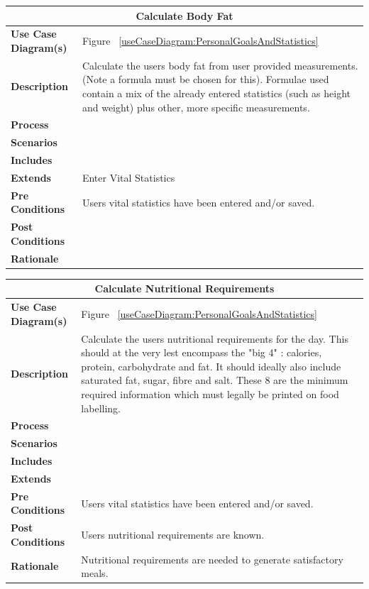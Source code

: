 \documentclass[12pt]{article}
\begin{document}
\begin{center}
\begin{tabularx}{\textwidth}{ |X|X|}
\hline
\multicolumn{2}{|c|}{\textbf{Calculate Body Fat}}\\
\hline
\hline
\textbf{Use Case Diagram(s)} & Figure ~\ref{useCaseDiagram:PersonalGoalsAndStatistics}\\ \hline
\textbf{Description} & Calculate the users body fat from user provided measurements. (Note a formula must be chosen for this). Formulae used contain a mix of the already entered statistics (such as height and weight) plus other, more specific measurements.\\ \hline
\textbf{Process} & \\ \hline
\textbf{Scenarios} & \\ \hline
\textbf{Includes} & \\ \hline
\textbf{Extends} & Enter Vital Statistics \\ \hline
\textbf{Pre Conditions} & Users vital statistics have been entered and/or saved.\\ \hline
\textbf{Post Conditions} & \\ \hline
\textbf{Rationale} & \\ \hline
\end{tabularx}
\end{center}


\begin{center}
\begin{tabularx}{\textwidth}{ |X|X|}
\hline
\multicolumn{2}{|c|}{\textbf{Calculate Nutritional Requirements}}\\
\hline
\hline
\textbf{Use Case Diagram(s)} & Figure ~\ref{useCaseDiagram:PersonalGoalsAndStatistics}\\ \hline
\textbf{Description} & Calculate the users nutritional requirements for the day. This should at the very lest encompass the "big 4" : calories, protein, carbohydrate and fat. It should ideally also include saturated fat, sugar, fibre and salt. These 8 are the minimum required information which must legally be printed on food labelling.\\ \hline
\textbf{Process} & \\ \hline
\textbf{Scenarios} & \\ \hline
\textbf{Includes} & \\ \hline
\textbf{Extends} &  \\ \hline
\textbf{Pre Conditions} & Users vital statistics have been entered and/or saved.\\ \hline
\textbf{Post Conditions} & Users nutritional requirements are known.\\ \hline
\textbf{Rationale} & Nutritional requirements are needed to generate satisfactory meals.\\ \hline
\end{tabularx}
\end{center}
\end{document}
